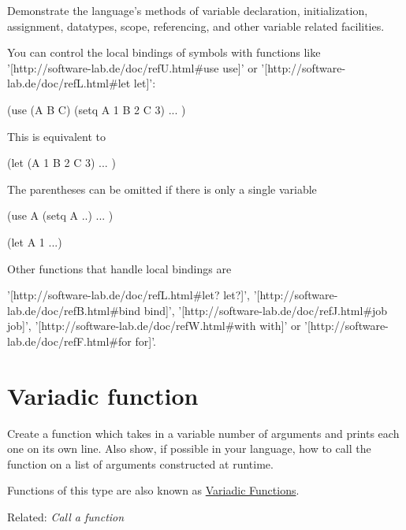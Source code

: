 Demonstrate the language's methods of variable declaration,
initialization, assignment, datatypes, scope, referencing, and other
variable related facilities.

\begin{wideverbatim}

You can control the local bindings of symbols with functions like
'[http://software-lab.de/doc/refU.html#use use]' or
'[http://software-lab.de/doc/refL.html#let let]':

(use (A B C)
   (setq A 1  B 2  C 3)
   ... )

This is equivalent to

(let (A 1  B 2  C 3)
   ... )

The parentheses can be omitted if there is only a single variable

(use A
   (setq A ..)
   ... )

(let A 1
   ...)

Other functions that handle local bindings are

'[http://software-lab.de/doc/refL.html#let? let?]',
'[http://software-lab.de/doc/refB.html#bind bind]',
'[http://software-lab.de/doc/refJ.html#job job]',
'[http://software-lab.de/doc/refW.html#with with]' or
'[http://software-lab.de/doc/refF.html#for for]'.

\end{wideverbatim}

\pagebreak{}
\section*{Variadic function}

Create a function which takes in a variable number of arguments and
prints each one on its own line. Also show, if possible in your
language, how to call the function on a list of arguments constructed
at runtime.

Functions of this type are also known as
\href{http://en.wikipedia.org/wiki/Variadic\_function}{Variadic
Functions}.

Related: \emph{Call a function}


